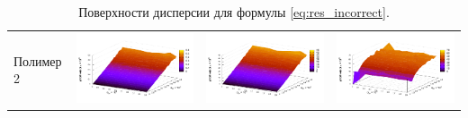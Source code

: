 \documentclass[11pt,a4paper]{article}
\theoremstyle{definition}
\begin{document}
\begin{table}[h]
\begin{tabular}{l | c c c}
	\begin{rotate}{90}Полимер 2\end{rotate} &	\includegraphics[scale=0.4]{figs/all/p2.txt_coeff0.dat.pdf} & \includegraphics[scale=0.4]{figs/all/p2.txt_coeff1.dat.pdf} & \includegraphics[scale=0.4]{figs/all/p2.txt_coeff2.dat.pdf}
  \end{tabular}
  \caption{Поверхности дисперсии для формулы \eqref{eq:res_incorrect}.}
  \label{tabl:res_incorrect}
\end{table}
\end{document}
